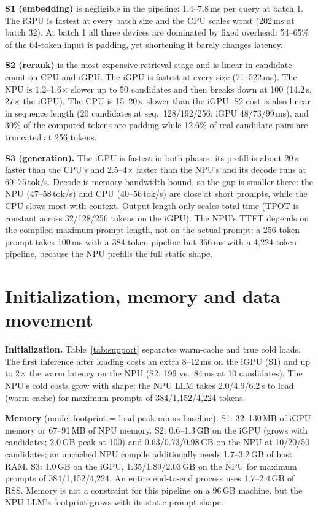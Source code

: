 \documentclass[10pt]{article}
\begin{document}
\textbf{S1 (embedding)} is negligible in the pipeline: 1.4--7.8\,ms per query at batch 1. The iGPU is fastest
at every batch size and the CPU scales worst (202\,ms at batch 32). At batch 1 all three devices are dominated by fixed
overhead: 54--65\% of the 64-token input is padding, yet shortening it barely changes latency.

\textbf{S2 (rerank)} is the most expensive retrieval stage and is linear in candidate count on CPU and iGPU. The iGPU
is fastest at every size (71--522\,ms). The NPU is 1.2--1.6$\times$ slower up to 50 candidates and then breaks
down at 100 (14.2\,s, 27$\times$ the iGPU). The CPU is 15--20$\times$ slower than the iGPU. S2 cost is also linear in
sequence length (20 candidates at seq.\ 128/192/256: iGPU 48/73/99\,ms), and 30\% of the computed tokens are padding
while 12.6\% of real candidate pairs are truncated at 256 tokens.

\textbf{S3 (generation).} The iGPU is fastest in both phases: its prefill is about 20$\times$ faster than the CPU's and 2.5--4$\times$ faster than the NPU's and
its decode runs at 69--75\,tok/s. Decode is memory-bandwidth bound, so the gap is smaller there: the NPU (47--58\,tok/s)
and CPU (40--56\,tok/s) are close at short prompts, while the CPU slows most with context. Output length only
scales total time (TPOT is constant across 32/128/256 tokens on the iGPU). The NPU's TTFT depends on the compiled
maximum prompt length, not on the actual prompt: a 256-token prompt takes 100\,ms with a 384-token pipeline but
366\,ms with a 4{,}224-token pipeline, because the NPU prefills the full static shape.

\section{Initialization, memory and data movement}

\textbf{Initialization.} Table~\ref{tab:support} separates warm-cache and true cold loads. The first inference
after loading costs an extra 8--12\,ms on the iGPU (S1) and up to 2$\times$ the warm latency on the NPU (S2: 199
vs.\ 84\,ms at 10 candidates). The NPU's cold costs grow with shape: the NPU LLM takes 2.0/4.9/6.2\,s to load
(warm cache) for maximum prompts of 384/1{,}152/4{,}224 tokens.

\textbf{Memory} (model footprint = load peak minus baseline). S1: 32--130\,MB of iGPU memory or 67--91\,MB of NPU
memory. S2: 0.6--1.3\,GB on the iGPU (grows with candidates; 2.0\,GB peak at 100) and 0.63/0.73/0.98\,GB on the NPU
at 10/20/50 candidates; an uncached NPU compile additionally needs 1.7--3.2\,GB of host RAM. S3: 1.0\,GB on the iGPU,
1.35/1.89/2.03\,GB on the NPU for maximum prompts of 384/1{,}152/4{,}224. An entire end-to-end process uses 1.7--2.4\,GB of
RSS. Memory is not a constraint for this pipeline on a 96\,GB machine, but the NPU LLM's footprint grows with its
static prompt shape.
\end{document}

